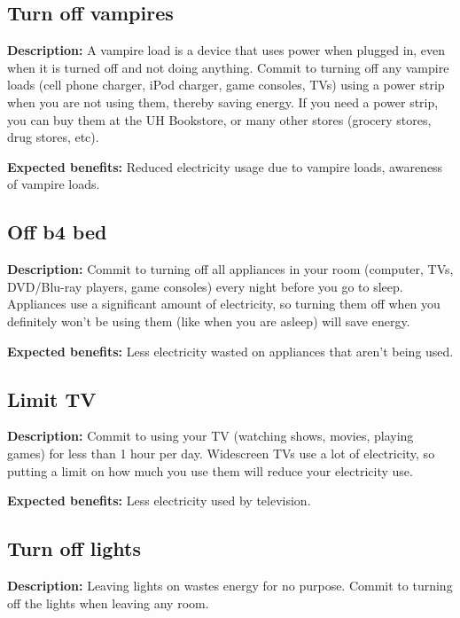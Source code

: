 \subsection{Turn off vampires}

\textbf{Description:} A vampire load is a device that uses power when plugged in, even when it is turned off and not doing anything. Commit to turning off any vampire loads (cell phone charger, iPod charger, game consoles, TVs) using a power strip when you are not using them, thereby saving energy. If you need a power strip, you can buy them at the UH Bookstore, or many other stores (grocery stores, drug stores, etc).

\vspace{2ex}
\textbf{Expected benefits:} Reduced electricity usage due to vampire loads, awareness of vampire loads.


\subsection{Off b4 bed}

\textbf{Description:} Commit to turning off all appliances in your room (computer, TVs, DVD/Blu-ray players, game consoles) every night before you go to sleep. Appliances use a significant amount of electricity, so turning them off when you definitely won't be using them (like when you are asleep) will save energy.

\vspace{2ex}
\textbf{Expected benefits:} Less electricity wasted on appliances that aren't being used.


\subsection{Limit TV}

\textbf{Description:} Commit to using your TV (watching shows, movies, playing games) for less than 1 hour per day. Widescreen TVs use a lot of electricity, so putting a limit on how much you use them will reduce your electricity use.

\vspace{2ex}
\textbf{Expected benefits:} Less electricity used by television.


\subsection{Turn off lights}

\textbf{Description:} Leaving lights on wastes energy for no purpose. Commit to turning off the lights when leaving any room.

